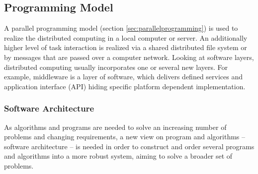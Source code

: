 \subsection{Programming Model}
\label{sec:distributedprogramming}

A parallel programming model (section \ref{sec:parallelprogramming}) is used to realize the distributed computing in a local computer or server. An additionally higher level of task interaction is realized via a shared distributed file system or by messages that are passed over a computer network. 
Looking at software layers, distributed computing usually incorporates one or several new layers. For example, middleware is a layer of software, which delivers defined services and application interface (API) hiding specific platform dependent implementation.

\subsubsection{Software Architecture}

As algorithms and programs are needed to solve an increasing number of problems and  changing requirements, a new view on program and algorithms -- software architecture -- is needed in order to construct and order several programs and algorithms into a more robust system, aiming to solve a broader set of problems.


